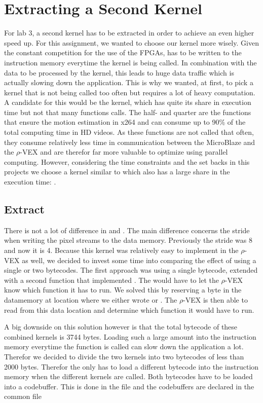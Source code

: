 
\section{Extracting a Second Kernel}
\label{sec:second}
For lab 3, a second kernel has to be extracted in order to achieve an even higher speed up. For this assignment, we wanted to choose our kernel more wisely. Given the constant competition for the use of the FPGAs,  has to be written to the instruction memory everytime the kernel is being called. In combination with the data to be processed by the kernel, this leads to huge data traffic which is actually slowing down the application. This is why we wanted, at first, to pick a kernel that is not being called too often but requires a lot of heavy computation. A candidate for this would be the  kernel, which has quite its share in execution time but not that many functions calls. The half- and quarter are the functions that ensure the motion estimation in x264 and can consume up to 90\% of the total computing time in HD videos. As these functions are not called that often, they consume relatively less time in communication between the MicroBlaze and the $\rho$-VEX and are therefor far more valuable to optimize using parallel computing. However, considering the time constraints and the set backs in this projects we choose a kernel similar to  which also has a large share in the execution time: .

\subsection{Extract }
\label{sec:4x4}
There is not a lot of difference in  and . The main difference concerns the stride when writing the pixel streams to the data memory. Previously the stride was 8 and now it is 4. Because this kernel was relatively easy to implement in the $\rho$-VEX as well, we decided to invest some time into comparing the effect of using a single or two bytecodes. The first approach was using a single bytecode, extended with a second function that implemented . The  would have to let the $\rho$-VEX know which function it has to run. We solved this by reserving a byte in the datamemory at location  where we either wrote  or . The $\rho$-VEX is then able to read from this data location and determine which function it would have to run. 

A big downside on this solution however is that the total bytecode of these combined kernels is 3744 bytes. Loading such a large amount into the instruction memory everytime the function is called can slow down the application a lot. Therefor we decided to divide the two kernels into two bytecodes of less than 2000 bytes. Therefor the  only has to load a different bytecode into the instruction memory when the different kernels are called. Both bytecodes have to be loaded into a codebuffer. This is done in the  file and the codebuffers are declared in the common file 